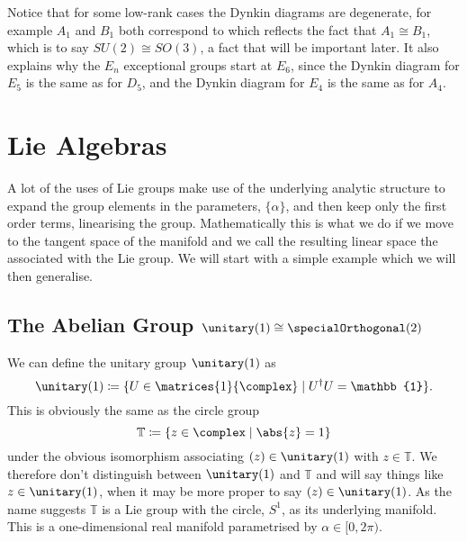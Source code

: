 \documentclass[fleqn]{NotesClass}
\newcommand*{\isomorphic}{\cong}
\newcommand*{\hermit}{\dagger}
\newcommand*{\ident}{\mathbb{1}}
\begin{document}
    Notice that for some low-rank cases the Dynkin diagrams are degenerate, for example \(A_1\) and \(B_1\) both correspond to
    which reflects the fact that \(A_1 \cong B_1\), which is to say \(SU(2) \cong SO(3)\), a fact that will be important later.
    It also explains why the \(E_n\) exceptional groups start at \(E_6\), since the Dynkin diagram for \(E_5\) is the same as for \(D_5\), and the Dynkin diagram for \(E_4\) is the same as for \(A_4\).
    
    \chapter{Lie Algebras}
    A lot of the uses of Lie groups make use of the underlying analytic structure to expand the group elements in the parameters, \(\{\alpha\}\), and then keep only the first order terms, linearising the group.
    Mathematically this is what we do if we move to the tangent space of the manifold and we call the resulting linear space the  associated with the Lie group.
    We will start with a simple example which we will then generalise.
    
    \section{The Abelian Group \texorpdfstring{\(\unitary(1) \isomorphic \specialOrthogonal(2)\)}{U(1) isomorphic to SO(2)}}
    We can define the unitary group \(\unitary(1)\) as
    \begin{equation}
        \unitary(1) \coloneqq \{ U \in \matrices{1}{\complex} \mid U^\hermit U = \ident \}.
    \end{equation}
    This is obviously the same as the circle group
    \begin{equation}
        \mathbb{T} \coloneqq \{ z \in \complex \mid \abs{z} = 1 \}
    \end{equation}
    under the obvious isomorphism associating \((z) \in \unitary(1)\) with \(z \in \mathbb{T}\).
    We therefore don't distinguish between \(\unitary(1)\) and \(\mathbb{T}\) and will say things like \(z \in \unitary(1)\), when it may be more proper to say \((z) \in \unitary(1)\).
    As the name suggests \(\mathbb{T}\) is a Lie group with the circle, \(S^1\), as its underlying manifold.
    This is a one-dimensional real manifold parametrised by \(\alpha \in [0, 2\pi)\).
    
\end{document}
